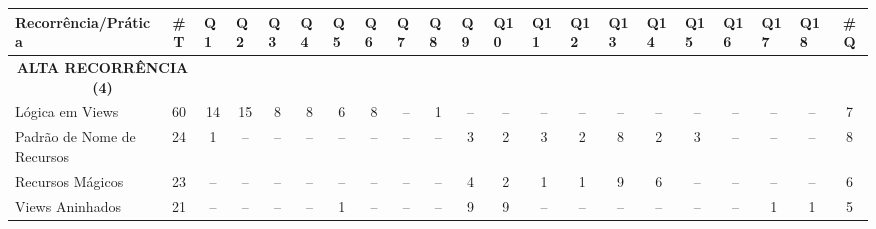 \begin{table*}[t]
\centering
\footnotesize
\begin{tabular}{@{}p{3.8cm}p{0.3cm}p{.2cm}p{.2cm}p{.2cm}p{.2cm}p{.2cm}p{.2cm}p{.2cm}p{.2cm}p{.2cm}p{.4cm}p{.4cm}p{.4cm}p{.4cm}p{.4cm}p{.4cm}p{.4cm}p{.4cm}p{.4cm}p{0.2cm}@{}}
\toprule
\textbf{Recorrência/Prática} & \multicolumn{1}{c}{\textbf{\#T}} & Q1 & Q2 & Q3 & Q4 & Q5 & Q6 & Q7 & Q8 & Q9 & Q10 & Q11 & Q12 & Q13 & Q14 & Q15 & Q16 & Q17 & Q18 &  \multicolumn{1}{c}{\textbf{\#Q}} \\
\hline
\multicolumn{2}{c}{\scriptsize{\textbf{ALTA RECORRÊNCIA (4)}}} \\
Lógica em Views					& \multicolumn{1}{c}{60} 	& \multicolumn{1}{c}{14} 	& \multicolumn{1}{c}{15} 	& \multicolumn{1}{c}{8}		& \multicolumn{1}{c}{8}		& \multicolumn{1}{c}{6}		& \multicolumn{1}{c}{8}		& \multicolumn{1}{c}{--}	& \multicolumn{1}{c}{1}		& \multicolumn{1}{c}{--}	& \multicolumn{1}{c}{--}	& \multicolumn{1}{c}{--}	& \multicolumn{1}{c}{--}	& \multicolumn{1}{c}{--}	& \multicolumn{1}{c}{--}	& \multicolumn{1}{c}{--}	& \multicolumn{1}{c}{--}	& \multicolumn{1}{c}{--} 	& \multicolumn{1}{c}{--}	& \multicolumn{1}{c}{7} \\
Padrão de Nome de Recursos		& \multicolumn{1}{c}{24} 	& \multicolumn{1}{c}{1} 	& \multicolumn{1}{c}{--} 	& \multicolumn{1}{c}{--}	& \multicolumn{1}{c}{--}	& \multicolumn{1}{c}{--}	& \multicolumn{1}{c}{--}	& \multicolumn{1}{c}{--}	& \multicolumn{1}{c}{--}	& \multicolumn{1}{c}{3}		& \multicolumn{1}{c}{2}		& \multicolumn{1}{c}{3}		& \multicolumn{1}{c}{2}		& \multicolumn{1}{c}{8}		& \multicolumn{1}{c}{2}		& \multicolumn{1}{c}{3}		& \multicolumn{1}{c}{--}	& \multicolumn{1}{c}{--} 	& \multicolumn{1}{c}{--}	& \multicolumn{1}{c}{8} \\
Recursos Mágicos				& \multicolumn{1}{c}{23} 	& \multicolumn{1}{c}{--} 	& \multicolumn{1}{c}{--} 	& \multicolumn{1}{c}{--}	& \multicolumn{1}{c}{--}	& \multicolumn{1}{c}{--}	& \multicolumn{1}{c}{--}	& \multicolumn{1}{c}{--}	& \multicolumn{1}{c}{--}	& \multicolumn{1}{c}{4}		& \multicolumn{1}{c}{2}		& \multicolumn{1}{c}{1}		& \multicolumn{1}{c}{1}		& \multicolumn{1}{c}{9}		& \multicolumn{1}{c}{6}		& \multicolumn{1}{c}{--}	& \multicolumn{1}{c}{--}	& \multicolumn{1}{c}{--} 	& \multicolumn{1}{c}{--}	& \multicolumn{1}{c}{6} \\
Views Aninhados					& \multicolumn{1}{c}{21} 	& \multicolumn{1}{c}{--} 	& \multicolumn{1}{c}{--} 	& \multicolumn{1}{c}{--}	& \multicolumn{1}{c}{--}	& \multicolumn{1}{c}{1}		& \multicolumn{1}{c}{--}	& \multicolumn{1}{c}{--}	& \multicolumn{1}{c}{--}	& \multicolumn{1}{c}{9}		& \multicolumn{1}{c}{9}		& \multicolumn{1}{c}{--}	& \multicolumn{1}{c}{--}	& \multicolumn{1}{c}{--}	& \multicolumn{1}{c}{--}	& \multicolumn{1}{c}{--}	& \multicolumn{1}{c}{--}	& \multicolumn{1}{c}{1} 	& \multicolumn{1}{c}{1}		& \multicolumn{1}{c}{5} \\


\end{tabular}
\end{table*}
